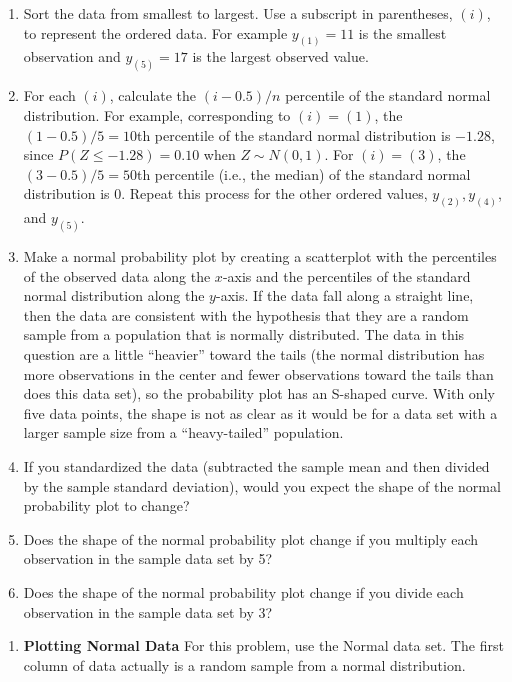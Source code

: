 \documentclass[
]{report}
\providecommand{\tightlist}{%
  \setlength{\itemsep}{0pt}\setlength{\parskip}{0pt}}
\begin{document}
\begin{enumerate}
\def\labelenumi{(\alph{enumi})}
\item
  Sort the data from smallest to largest. Use a subscript in parentheses, \(\scriptstyle (i)\), to represent the ordered data. For example \(\scriptstyle y_{(1)} = 11\) is the smallest observation and \(\scriptstyle y_{(5)} = 17\) is the largest observed value.
\item
  For each \(\scriptstyle (i)\), calculate the \(\scriptstyle (i - 0.5)/n\) percentile of the standard normal distribution. For example, corresponding to \(\scriptstyle (i) = (1)\), the \(\scriptstyle (1 - 0.5)/5 = 10\)th percentile of the standard normal distribution is \(\scriptstyle -1.28\), since \(\scriptstyle P(Z \leq -1.28) = 0.10\) when \(\scriptstyle Z \sim N(0, 1)\). For \(\scriptstyle (i) = (3)\), the \(\scriptstyle (3 - 0.5)/5 = 50\)th percentile (i.e., the median) of the standard normal distribution is \(\scriptstyle 0\). Repeat this process for the other ordered values, \(\scriptstyle y_{(2)}, y_{(4)}\), and \(\scriptstyle y_{(5)}\).
\item
  Make a normal probability plot by creating a scatterplot with the percentiles of the observed data along the \(\scriptstyle x\)-axis and the percentiles of the standard normal distribution along the \(\scriptstyle y\)-axis. If the data fall along a straight line, then the data are consistent with the hypothesis that they are a random sample from a population that is normally distributed. The data in this question are a little ``heavier'' toward the tails (the normal distribution has more observations in the center and fewer observations toward the tails than does this data set), so the probability plot has an S-shaped curve. With only five data points, the shape is not as clear as it would be for a data set with a larger sample size from a ``heavy-tailed'' population.
\item
  If you standardized the data (subtracted the sample mean and then divided by the sample standard deviation), would you expect the shape of the normal probability plot to change?
\item
  Does the shape of the normal probability plot change if you multiply each observation in the sample data set by 5?
\item
  Does the shape of the normal probability plot change if you divide each observation in the sample data set by 3?
\end{enumerate}

\begin{enumerate}
\def\labelenumi{\arabic{enumi}.}
\setcounter{enumi}{28}
\tightlist
\item
  \textbf{Plotting Normal Data} For this problem, use the Normal data set. The first column of data actually is a random sample from a normal distribution. \vspace{-1em}
\end{enumerate}
\end{document}
